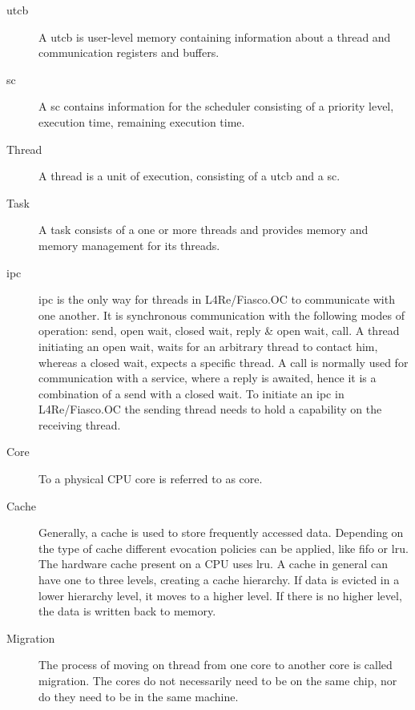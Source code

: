 \begin{description}
  \item[\Gls{utcb}] A \gls{utcb} is user-level memory containing information
    about a thread and communication registers and buffers.

  \item[\Gls{sc}] A \gls{sc} contains information for the scheduler consisting
    of a priority level, execution time, remaining execution time.

  \item[Thread] A thread is a unit of execution, consisting of a \gls{utcb}
    and a \gls{sc}.

  \item[Task] A task consists of a one or more threads and provides memory and
    memory management for its threads.

  \item[\Gls{ipc}] \Gls{ipc} is the only way for threads in L4Re/Fiasco.OC
    to communicate with one another.
    It is synchronous communication with the following modes of operation:
    send, open wait, closed wait, reply \& open wait, call.
    A thread initiating an open wait, waits for an arbitrary thread to contact
    him, whereas a closed wait, expects a specific thread.
    A call is normally used for communication with a service, where a reply is
    awaited, hence it is a
    combination of a send with a closed wait.
    To initiate an \gls{ipc} in L4Re/Fiasco.OC the sending thread needs to hold
    a capability on the receiving thread.


  \item[Core] To a physical CPU core is referred to as core.

  \item[Cache] Generally, a cache is used to store frequently accessed data.
    Depending on the type of cache different evocation policies can be applied,
    like \gls{fifo} or \gls{lru}.
    The hardware cache present on a CPU uses \gls{lru}.
    A cache in general can have one to three levels, creating a cache hierarchy.
    If data is evicted in a lower hierarchy level, it moves to a higher level.
    If there is no higher level, the data is written back to memory.

  \item[Migration] The process of moving on thread from one core
    to another core is called migration.
    The cores do not necessarily need to be on the same chip, nor do they need
    to be in the same machine.


\end{description}
